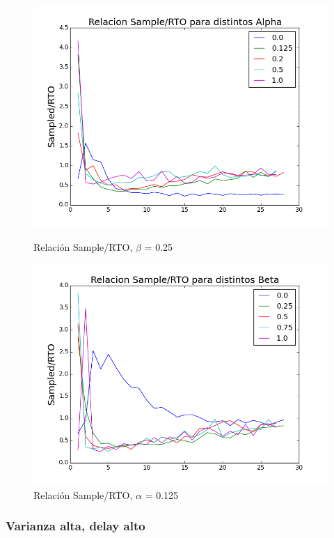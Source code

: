\begin{figure}[H]
\begin{minipage}{0.5\linewidth}
\includegraphics[width=\linewidth]{../graficos/alphad025var2drop0.png}
\caption{Relación Sample/RTO, $\beta$ = 0.25}\label{fig:alpha-var2-drop0-alto}
\end{minipage}
\hfill
\begin{minipage}{0.5\linewidth}
\includegraphics[width=\linewidth]{../graficos/betad025var2drop0.png}
\caption{Relación Sample/RTO, $\alpha$ = 0.125}\label{fig:beta-var2-drop0-alto}
\end{minipage}
\end{figure}

\subsubsection{Varianza alta, delay alto}

